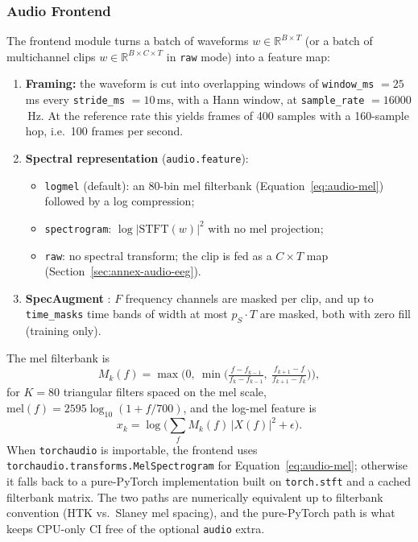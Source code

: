 \subsubsection{Audio Frontend}

The frontend module turns a batch of waveforms $w \in \mathbb{R}^{B \times T}$ (or a batch of multichannel clips $w \in \mathbb{R}^{B \times C \times T}$ in \texttt{raw} mode) into a feature map:

\begin{enumerate}[leftmargin=*]
    \item \textbf{Framing:} the waveform is cut into overlapping windows of \texttt{window\_ms} $=25$\,ms every \texttt{stride\_ms} $=10$\,ms, with a Hann window, at \texttt{sample\_rate} $=16000$\,Hz. At the reference rate this yields frames of 400 samples with a 160-sample hop, i.e.\ 100 frames per second.
    \item \textbf{Spectral representation} (\texttt{audio.feature}):
    \begin{itemize}[leftmargin=*]
        \item \texttt{logmel} (default): an $80$-bin mel filterbank (Equation~\ref{eq:audio-mel}) followed by a log compression;
        \item \texttt{spectrogram}: $\log|\mathrm{STFT}(w)|^2$ with no mel projection;
        \item \texttt{raw}: no spectral transform; the clip is fed as a $C \times T$ map (Section~\ref{sec:annex-audio-eeg}).
    \end{itemize}
    \item \textbf{SpecAugment} \citep{Park2019}: $F$ frequency channels are masked per clip, and up to \texttt{time\_masks} time bands of width at most $p_S \cdot T$ are masked, both with zero fill (training only).
\end{enumerate}

The mel filterbank is
\begin{equation}
M_k(f) = \max\Big(0,\ \min\Big(\tfrac{f-f_{k-1}}{f_k-f_{k-1}},\ \tfrac{f_{k+1}-f}{f_{k+1}-f_k}\Big)\Big),
\label{eq:audio-filterbank}
\end{equation}
for $K = 80$ triangular filters spaced on the mel scale, $\mathrm{mel}(f) = 2595 \log_{10}(1 + f/700)$, and the log-mel feature is
\begin{equation}
x_k = \log\Big(\sum_{f} M_k(f)\,|X(f)|^2 + \epsilon\Big).
\label{eq:audio-mel}
\end{equation} When \texttt{torchaudio} is importable, the frontend uses \texttt{torchaudio.transforms.MelSpectrogram} for Equation~\ref{eq:audio-mel}; otherwise it falls back to a pure-PyTorch implementation built on \texttt{torch.stft} and a cached filterbank matrix. The two paths are numerically equivalent up to filterbank convention (HTK vs.\ Slaney mel spacing), and the pure-PyTorch path is what keeps CPU-only CI free of the optional \texttt{audio} extra.

